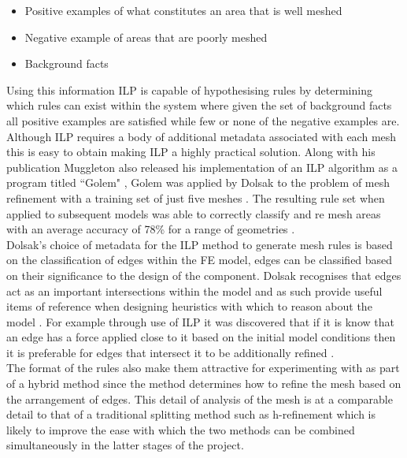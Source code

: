 \begin{itemize}
\item Positive examples  of what constitutes an area that is well meshed
\item Negative example of areas that are poorly meshed
\item Background facts
\end{itemize}

\noindent
Using this information ILP is capable of hypothesising rules by determining which rules can exist within the system where given the set of background facts all positive examples are satisfied while few or none of the negative examples are. Although ILP requires a body of additional metadata associated with each mesh this is easy to obtain making ILP a highly practical solution. Along with his publication Muggleton also released his implementation of an ILP algorithm as a program titled ``Golem" \cite{Golem}, Golem was applied by Dolsak to the problem of mesh refinement with a training set of just five meshes \cite{DolsakPaper94}. The resulting rule set when applied to subsequent models was able to correctly classify and re mesh areas with an average accuracy of 78\% for a range of geometries \cite{DolsakPaper94} \cite{appOfILPToFEMeshDesign}. \\

\noindent
Dolsak's choice of metadata for the ILP method to generate mesh rules is based on the classification of edges within the FE model, edges can be classified based on their significance to the design of the component. Dolsak recognises that edges act as an important intersections within the model and as such provide useful items of reference when designing heuristics with which to reason about the model \cite{DolsakPaper94} \cite{appOfILPToFEMeshDesign}.  For example through use of ILP it was discovered that if it is know that an edge has a force applied close to it based on the initial model conditions then it is preferable for edges that intersect it to be additionally refined \cite{DolsakPaper91} \cite{appOfILPToFEMeshDesign}. \\ 

\noindent
The format of the rules also make them attractive for experimenting with as part of a hybrid method since the method determines how to refine the mesh based on the arrangement of edges. This detail of analysis of the mesh is at a comparable detail to that of a traditional splitting method such as h-refinement which is likely to improve the ease with which the two methods can be combined simultaneously in the latter stages of the project. \\ 

